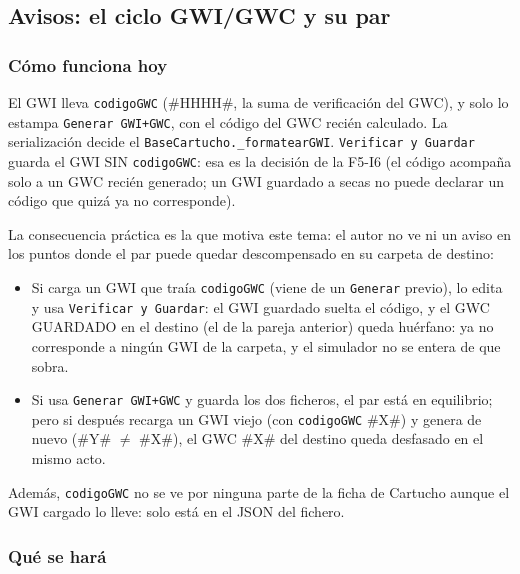 \subsection{Avisos: el ciclo GWI/GWC y su par}
\label{sec:F5I17Par}

\subsubsection{Cómo funciona hoy}
\label{sec:F5I17ParHoy}

El GWI lleva \texttt{codigoGWC} (\#HHHH\#, la suma de verificación del GWC), y solo lo estampa \texttt{Generar GWI+GWC}, con el código del GWC recién calculado. 
La serialización decide el \texttt{BaseCartucho.\_formatearGWI}. \texttt{Verificar y Guardar} guarda el GWI SIN \texttt{codigoGWC}: esa es la decisión de la F5-I6 (el código acompaña solo a un GWC recién generado; un GWI guardado a secas no puede declarar un código que quizá ya no corresponde).

La consecuencia práctica es la que motiva este tema: el autor no ve ni un aviso en los puntos donde el par puede quedar descompensado en su carpeta de destino:

\begin{itemize}
	\item Si carga un GWI que traía \texttt{codigoGWC} (viene de un \texttt{Generar} previo), lo edita y usa \texttt{Verificar y Guardar}: el GWI guardado suelta el código, y el GWC GUARDADO en el destino (el de la pareja anterior) queda huérfano: ya no corresponde a ningún GWI de la carpeta, y el simulador no se entera de que sobra.
	\item Si usa \texttt{Generar GWI+GWC} y guarda los dos ficheros, el par está en equilibrio; pero si después recarga un GWI viejo (con \texttt{codigoGWC} \#X\#) y genera de nuevo (\#Y\# $\neq$ \#X\#), el GWC \#X\# del destino queda desfasado en el mismo acto.
\end{itemize}

Además, \texttt{codigoGWC} no se ve por ninguna parte de la ficha de Cartucho aunque el GWI cargado lo lleve: solo está en el JSON del fichero.

\subsubsection{Qué se hará}
\label{sec:F5I17ParQue}

